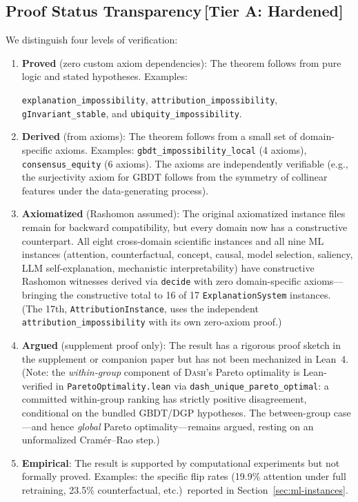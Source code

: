 \documentclass[11pt,a4paper]{article}
\newcommand{\DASH}{\textsc{Dash}}
\begin{document}
\subsection{Proof Status Transparency\,\textnormal{\normalsize[Tier A: Hardened]}}
\label{sec:proof-status}

We distinguish four levels of verification:

\begin{enumerate}[label=(\alph*)]
  \item \textbf{Proved} (zero custom axiom dependencies): The theorem
    follows from pure logic and stated hypotheses.  Examples:
    {\raggedright\texttt{explanation\_impossibility},
    \texttt{attribution\_impossibility},
    \texttt{gInvariant\_stable}, and
    \texttt{ubiquity\_impossibility}.\par}

  \item \textbf{Derived} (from axioms): The theorem follows from a small set
    of domain-specific axioms.  Examples: \texttt{gbdt\_impossibility\_local}
    (4 axioms), \texttt{consensus\_equity} (6 axioms).  The axioms are
    independently verifiable (e.g., the surjectivity axiom for GBDT follows
    from the symmetry of collinear features under the data-generating process).

  \item \textbf{Axiomatized} (Rashomon assumed): The original axiomatized
    instance files remain for backward compatibility, but every domain now
    has a constructive counterpart.  All eight cross-domain scientific
    instances and all nine ML instances (attention, counterfactual, concept,
    causal, model selection, saliency, LLM self-explanation, mechanistic
    interpretability) have constructive Rashomon witnesses derived via
    \texttt{decide} with zero domain-specific axioms---bringing the
    constructive total to 16 of 17 \texttt{ExplanationSystem} instances.
    (The 17th, \texttt{AttributionInstance}, uses the independent
    \texttt{attribution\_impossibility} with its own zero-axiom proof.)

  \item \textbf{Argued} (supplement proof only): The result has a
    rigorous proof sketch in the supplement or companion paper but has
    not been mechanized in Lean~4.  (Note: the \emph{within-group}
    component of \DASH{}'s Pareto optimality is Lean-verified in
    \texttt{ParetoOptimality.lean} via
    \texttt{dash\_unique\_pareto\_optimal}: a committed within-group
    ranking has strictly positive disagreement, conditional on the
    bundled GBDT/DGP hypotheses.  The between-group case---and hence
    \emph{global} Pareto optimality---remains argued, resting on an
    unformalized Cram\'er--Rao step.)

  \item \textbf{Empirical}: The result is supported by computational
    experiments but not formally proved.  Examples: the specific flip
    rates (19.9\% attention under full retraining, 23.5\%
    counterfactual, etc.)\ reported in Section~\ref{sec:ml-instances}.
\end{enumerate}
\end{document}
